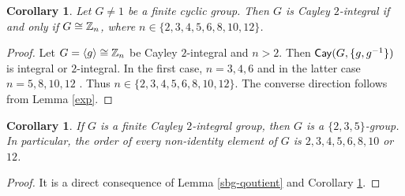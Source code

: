 \documentclass{amsart}
\newtheorem{core}[thm]{Corollary}
\def \geq {\geqslant}
\def\Cay{{\sf Cay}} \def\Ker{{\sf Ker}}
\begin{document}

\begin{core}\label{order}
	Let $G\neq 1$ be a finite cyclic group. Then $G$ is  Cayley $2$-integral if and only if $G\cong\Bbb Z_n$, where $n\in\{2,3,4,5,6,8,10,12\}$.
\end{core}
\begin{proof}
	Let $G=\langle g\rangle\cong\Bbb Z_n$ be Cayley $2$-integral and $n>2$. Then $\Cay(G,\{g,g^{-1}\})$ is integral or $2$-integral. In the first case, $n=3,4,6$ \cite[Lemma 2.7]{AV} and in the latter case $n=5,8,10,12$ \cite[Theorem 5.1]{AAFW}. Thus $n\in\{2,3,4,5,6,8,10,12\}$. The converse direction follows from Lemma \ref{exp}.
\end{proof}

\begin{core}\label{2,3,5}
	If $G$ is a finite Cayley $2$-integral group, then $G$ is a $\{2,3,5\}$-group. In particular, the order of every non-identity element of $G$ is $2,3,4,5,6,8,10$ or $12$.
\end{core}
\begin{proof}
	It is a direct consequence of Lemma \ref{sbg-qoutient} and Corollary \ref{order}.
\end{proof}
\end{document}
